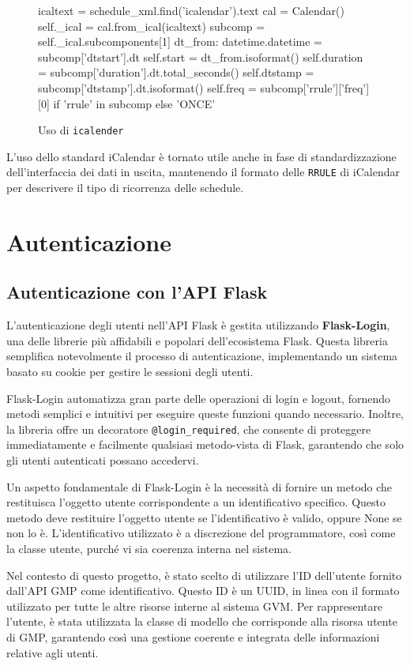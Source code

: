\begin{figure}
\begin{pycode}
icaltext = schedule_xml.find('icalendar').text
cal = Calendar()
self._ical = cal.from_ical(icaltext)
subcomp = self._ical.subcomponents[1]
dt_from: datetime.datetime = subcomp['dtstart'].dt
self.start = dt_from.isoformat()
self.duration = subcomp['duration'].dt.total_seconds()
self.dtstamp = subcomp['dtstamp'].dt.isoformat()
self.freq = subcomp['rrule']['freq'][0] if 'rrule' in subcomp else 'ONCE'
\end{pycode}
\caption{Uso di \texttt{icalender}}
\end{figure}

L'uso dello standard iCalendar è tornato utile anche in fase di standardizzazione dell'interfaccia dei dati in uscita, mantenendo il formato delle \texttt{RRULE} di iCalendar per descrivere il tipo di ricorrenza delle schedule.

\section{Autenticazione}
\subsection{Autenticazione con l'API Flask}
L'autenticazione degli utenti nell'API Flask è gestita utilizzando \textbf{Flask-Login}, una delle librerie più affidabili e popolari dell'ecosistema Flask. Questa libreria semplifica notevolmente il processo di autenticazione, implementando un sistema basato su cookie per gestire le sessioni degli utenti.

Flask-Login automatizza gran parte delle operazioni di login e logout, fornendo metodi semplici e intuitivi per eseguire queste funzioni quando necessario. Inoltre, la libreria offre un decoratore \texttt{@login\_required}, che consente di proteggere immediatamente e facilmente qualsiasi metodo-vista di Flask, garantendo che solo gli utenti autenticati possano accedervi.

Un aspetto fondamentale di Flask-Login è la necessità di fornire un metodo che restituisca l'oggetto utente corrispondente a un identificativo specifico. Questo metodo deve restituire l'oggetto utente se l'identificativo è valido, oppure None se non lo è. L'identificativo utilizzato è a discrezione del programmatore, così come la classe utente, purché vi sia coerenza interna nel sistema.

Nel contesto di questo progetto, è stato scelto di utilizzare l'ID dell'utente fornito dall'API GMP come identificativo. Questo ID è un UUID, in linea con il formato utilizzato per tutte le altre risorse interne al sistema GVM. Per rappresentare l'utente, è stata utilizzata la classe di modello che corrisponde alla risorsa utente di GMP, garantendo così una gestione coerente e integrata delle informazioni relative agli utenti.

